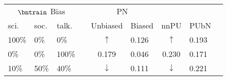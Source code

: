 \begin{tabular}{@{}lllllllll@{}}
  \toprule
  \multicolumn{3}{c}{$\bntrain$ Bias} &    & \multicolumn{2}{c}{PN} &       &      \\\cmidrule{1-3}\cmidrule{5-6}
  sci.   & soc.   & talk.       &   & Unbiased                          & Biased          & nnPU                             & PUbN \\\midrule
  100\%  & 0\%    & 0\%         &   & \multicolumn{1}{c}{$\uparrow$}    & 0.126           & \multicolumn{1}{c}{$\uparrow$}   & 0.193 \\
  0\%    & 0\%    & 100\%       &   & \multicolumn{1}{c}{0.179}         & 0.046           & \multicolumn{1}{c}{0.230}        & 0.171 \\
  10\%   & 50\%   & 40\%        &   & \multicolumn{1}{c}{$\downarrow$}  & 0.111           & \multicolumn{1}{c}{$\downarrow$} & 0.221 \\
  \bottomrule
\end{tabular}
